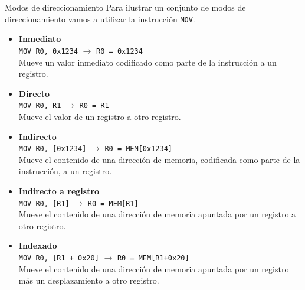 \documentclass[aspectratio=169]{beamer}
\begin{document}
\begin{frame}[fragile,t]{Modos de direccionamiento}
    Para ilustrar un conjunto de modos de direccionamiento vamos a utilizar la instrucción \texttt{MOV}.
    \begin{itemize}
    \item<1-> \small \textbf{Inmediato}\\
    \hspace{0.2cm} \textcolor{verdeuca}{\texttt{MOV R0, 0x1234}} \hspace{0.2cm} $\rightarrow$ \hspace{0.2cm} \textcolor{verdeuca}{\texttt{R0 = 0x1234}}\\
    \hspace{0.4cm} \scriptsize Mueve un valor inmediato codificado como parte de la instrucción a un registro.
    \item<2-> \small \textbf{Directo}\\
    \hspace{0.2cm} \textcolor{verdeuca}{\texttt{MOV R0, R1}} \hspace{0.2cm} $\rightarrow$ \hspace{0.2cm} \textcolor{verdeuca}{\texttt{R0 = R1}}\\
    \hspace{0.4cm} \scriptsize Mueve el valor de un registro a otro registro. 
    \item<3-> \small \textbf{Indirecto}\\
    \hspace{0.2cm} \textcolor{verdeuca}{\texttt{MOV R0, [0x1234]}} \hspace{0.2cm} $\rightarrow$ \hspace{0.2cm} \textcolor{verdeuca}{\texttt{R0 = MEM[0x1234]}}\\
    \hspace{0.4cm} \scriptsize Mueve el contenido de una dirección de memoria, codificada como parte de la instrucción, a un registro.
    \item<4-> \small \textbf{Indirecto a registro}\\
    \hspace{0.2cm} \textcolor{verdeuca}{\texttt{MOV R0, [R1]}} \hspace{0.2cm} $\rightarrow$ \hspace{0.2cm} \textcolor{verdeuca}{\texttt{R0 = MEM[R1]}}\\
    \hspace{0.4cm} \scriptsize Mueve el contenido de una dirección de memoria apuntada por un registro a otro registro.
    \item<5-> \small \textbf{Indexado}\\
    \hspace{0.2cm} \textcolor{verdeuca}{\texttt{MOV R0, [R1 + 0x20]}} \hspace{0.2cm} $\rightarrow$ \hspace{0.2cm} \textcolor{verdeuca}{\texttt{R0 = MEM[R1+0x20] }}\\
    \hspace{0.4cm} \scriptsize Mueve el contenido de una dirección de memoria apuntada por un registro más un desplazamiento a otro registro.
    \end{itemize}
\end{frame}
\end{document}
